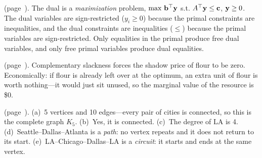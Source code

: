 \medskip

\noindent\textbf{} (page~\pageref{lc:dual-forms}).
The dual is a \emph{maximization} problem, $\max\, \mathbf{b}^\top \mathbf{y}$ s.t. $A^\top \mathbf{y} \leq \mathbf{c}$, $\mathbf{y} \geq 0$. The dual variables are sign-restricted ($y_i \geq 0$) because the primal constraints are inequalities, and the dual constraints are inequalities ($\leq$) because the primal variables are sign-restricted. Only equalities in the primal produce free dual variables, and only free primal variables produce dual equalities.

\medskip

\noindent\textbf{} (page~\pageref{lc:cs-leftover}).
Complementary slackness forces the shadow price of flour to be zero. Economically: if flour is already left over at the optimum, an extra unit of flour is worth nothing---it would just sit unused, so the marginal value of the resource is \$0.

\medskip

\noindent\textbf{} (page~\pageref{lc:graph-5cities}).
(a)~5 vertices and 10 edges---every pair of cities is connected, so this is the complete graph $K_5$.
(b)~Yes, it is connected.
(c)~The degree of LA is 4.
(d)~Seattle--Dallas--Atlanta is a \emph{path}: no vertex repeats and it does not return to its start.
(e)~LA--Chicago--Dallas--LA is a \emph{circuit}: it starts and ends at the same vertex.
